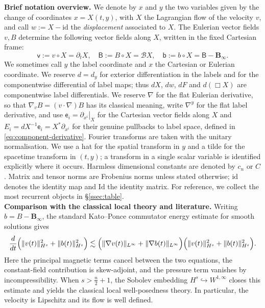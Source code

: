 \documentclass[11pt,reqno]{amsart}
\theoremstyle{plain}
\theoremstyle{definition}
\theoremstyle{remark}
\numberwithin{equation}{section}
\newcommand{\eframe}{\mathsf e}   %
\newcommand{\vLag}{\mathsf v}
\newcommand{\BLag}{\mathsf B}
\newcommand{\bLag}{\mathsf b}
\newcommand{\Binf}{\mathbf B_\infty}
\begin{document}
\textbf{Brief notation overview.} We denote by $x$ and $y$ the two variables given by the change of coordinates $x=X(t,y)$, with $X$ the Lagrangian flow of the velocity $v$, and call $w:=X-\mathrm{id}$ the \emph{displacement} associated to $X$. The
Eulerian vector fields $v,B$ determine the following vector fields along $X$, written in the fixed Cartesian frame:
\begin{equation}
    \vLag:=v\circ X=\partial_tX, \quad \BLag:=B\circ X=\mathcal BX, \quad \bLag:=b\circ X=\BLag-\Binf.
\end{equation}
We sometimes call $y$ the label coordinate and $x$ the Cartesian or Eulerian coordinate. We reserve $d=d_{y}$ for exterior differentiation in the labels and for the componentwise
differential of label maps; thus $dX$, $dw$, $dF$ and
$d(\Box X)$ are componentwise label differentials.
We reserve $\nabla$ for the flat Eulerian derivative, so that $\nabla_v B=(v\cdot\nabla)B$ has its classical meaning, write $\nabla^{y}$ for the flat
label derivative, and use $\eframe_i=\left.\partial_{x^i}\right|_{X}$ for the Cartesian vector fields along $X$ and $E_i=dX^{-1}\eframe_i=X^*\partial_{x^i}$ for their genuine pullbacks to label space, defined in \eqref{eq:component-derivative}. 
Fourier transforms are taken with the unitary normalisation. We use a hat for the spatial
transform in $y$ and a tilde for the spacetime transform in $(t,y)$; a transform in a single
scalar variable is identified explicitly where it occurs. Harmless dimensional constants are
denoted by $c_n$ or $C$. 
Matrix and tensor norms are Frobenius norms unless stated otherwise; $\mathrm{id}$ denotes
the identity map and $\mathrm{Id}$ the identity matrix. For reference, we collect the most recurrent objects in \S\ref{ssec:table}.\\

\textbf{Comparison with the classical local theory and literature.}
Writing $b=B-\Binf$, the standard Kato--Ponce commutator energy estimate for smooth
solutions gives
\begin{equation}\label{eq:standardHsintro}
    \frac{d}{dt}
 \Bigl(\|v(t)\|_{H^s}^2+\|b(t)\|_{H^s}^2\Bigr)
 \lesssim
 \Bigl(\|\nabla v(t)\|_{L^\infty}
       +\|\nabla b(t)\|_{L^\infty}\Bigr)
 \Bigl(\|v(t)\|_{H^s}^2+\|b(t)\|_{H^s}^2\Bigr).
\end{equation}
Here the principal magnetic terms cancel between the two equations, the
constant-field contribution is skew-adjoint, and the pressure term vanishes
by incompressibility. When $s>\frac n2+1$, the Sobolev embedding
$H^s\hookrightarrow W^{1,\infty}$ closes this estimate and yields the
classical local well-posedness theory. In particular, the velocity is
Lipschitz and its flow is well defined.
\end{document}
